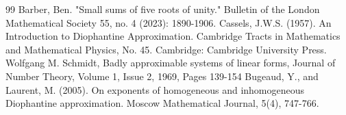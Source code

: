 \documentclass[10pt,a4paper]{amsart}
\begin{document}
\begin{thebibliography}{99}
 Barber, Ben. "Small sums of five roots of unity." Bulletin of the London Mathematical Society 55, no. 4 (2023): 1890-1906.
 Cassels, J.W.S. (1957). An Introduction to Diophantine Approximation. Cambridge Tracts in Mathematics and Mathematical Physics, No. 45. Cambridge: Cambridge University Press.
 Wolfgang M. Schmidt, Badly approximable systems of linear forms, Journal of Number Theory, Volume 1, Issue 2, 1969, Pages 139-154
 Bugeaud, Y., and Laurent, M. (2005). On exponents of homogeneous and inhomogeneous Diophantine approximation. Moscow Mathematical Journal, 5(4), 747-766.
\end{thebibliography}
\end{document}
